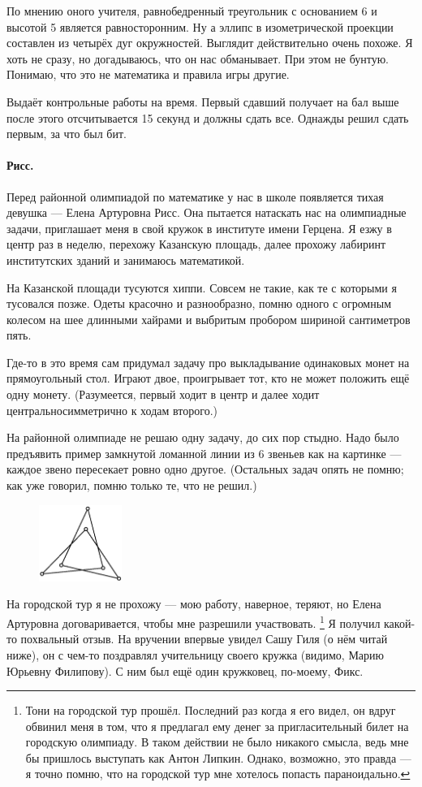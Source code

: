 \documentclass{book}
\begin{document}
По мнению оного учителя,  
равнобедренный треугольник с основанием 6 и высотой 5 является равносторонним.
Ну а эллипс в изометрической проекции составлен из четырёх дуг окружностей.
Выглядит действительно очень похоже.
Я хоть не сразу, но догадываюсь, что он нас обманывает.
При этом не бунтую. 
Понимаю, что это не математика и правила игры другие.

Выдаёт контрольные работы на время.
Первый сдавший получает на бал выше после этого отсчитывается 15 секунд и должны сдать все.
Однажды решил сдать первым, за что был бит.


\paragraph{Рисс.}
Перед районной олимпиадой по математике у нас в школе появляется тихая девушка --- Елена Артуровна Рисс.
Она пытается натаскать нас на олимпиадные задачи, 
приглашает меня в свой кружок 
в институте имени Герцена.
Я езжу в центр раз в неделю, перехожу Казанскую площадь, далее прохожу лабиринт институтских зданий и занимаюсь математикой.

На Казанской площади тусуются хиппи.
Совсем не такие, как те с которыми я тусовался позже.
Одеты красочно и разнообразно, помню одного с огромным колесом на шее длинными хайрами и выбритым пробором шириной сантиметров пять.

Где-то в это время сам придумал задачу про выкладывание одинаковых монет на прямоугольный стол.
Играют двое, проигрывает тот, кто не может положить ещё одну монету.
(Разумеется, первый ходит в центр и далее ходит центральносимметрично к ходам второго.)

На районной олимпиаде не решаю одну задачу, 
до сих пор стыдно.
Надо было предъявить пример замкнутой ломанной линии из 6 звеньев как на картинке ---
каждое звено пересекает ровно одно другое.
(Остальных задач опять не помню; как уже говорил, помню только те, что не решил.)

\begin{figure}
\vskip-8mm
\centering
\includegraphics[width=27mm,angle=0]{pics/lomannaya}
\vskip-4mm
\end{figure}

На городской тур я не прохожу
--- мою работу, наверное, теряют,
но Елена Артуровна договаривается, чтобы мне разрешили участвовать.%
\footnote{Тони на городской тур прошёл.
Последний раз когда я его видел,
он вдруг обвинил меня в том, 
что я предлагал ему денег за пригласительный билет на городскую олимпиаду.
В таком действии не было никакого смысла, ведь мне бы пришлось выступать как Антон Липкин.
Однако, возможно, это правда --- я точно помню, что на городской тур мне хотелось попасть параноидально.}
Я получил какой-то похвальный отзыв.
На вручении впервые увидел Сашу Гиля (о нём читай ниже), он с чем-то поздравлял учительницу своего кружка (видимо, Марию Юрьевну Филипову).
С ним был ещё один кружковец, по-моему, Фикс.
\end{document}
